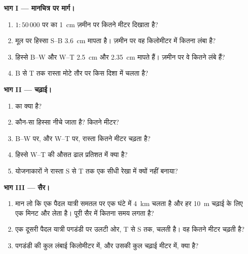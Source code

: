 \begin{problem}
\noindent\textbf{भाग I --- मानचित्र पर मार्ग।}\par\nopagebreak
\begin{enumerate}[beginpenalty=10000]
  \item $1 : 50\,000$ पर  का \qty{1}{cm} ज़मीन पर कितने मीटर
        दिखाता है?
  \item मूल  पर हिस्सा S--B \qty{3.6}{cm} मापता है। ज़मीन पर वह किलोमीटर में
        कितना लंबा है?
  \item हिस्से B--W और W--T \qty{2.5}{cm} और \qty{2.35}{cm} मापते हैं।
        ज़मीन पर वे कितने लंबे हैं?
  \item B से T तक रास्ता मोटे तौर पर किस दिशा में चलता है?
\end{enumerate}

\noindent\textbf{भाग II --- चढ़ाई।}\par\nopagebreak
\begin{enumerate}[resume, beginpenalty=10000]
  \item {} का  क्या है?
  \item कौन-सा हिस्सा नीचे जाता है? कितने मीटर?
  \item B--W पर, और W--T पर, रास्ता कितने मीटर चढ़ता है?
  \item हिस्से W--T की औसत ढाल प्रतिशत में क्या है?
  \item योजनाकारों ने रास्ता S से T तक एक सीधी रेखा में क्यों नहीं
        बनाया?
\end{enumerate}

\noindent\textbf{भाग III --- सैर।}\par\nopagebreak
\begin{enumerate}[resume, beginpenalty=10000]
  \item मान लो कि एक पैदल यात्री समतल पर एक घंटे में \qty{4}{km} चलता है और हर
        \qty{10}{m} चढ़ाई के लिए एक मिनट और लेता है। पूरी सैर में कितना समय
        लगता है?
  \item एक दूसरी पैदल यात्री पगडंडी पर उलटी ओर, T से S तक, चलती है। वह कितने मीटर
        चढ़ती है?
  \item पगडंडी की कुल लंबाई किलोमीटर में, और उसकी कुल चढ़ाई मीटर में, क्या
        है?
\end{enumerate}
\end{problem}
